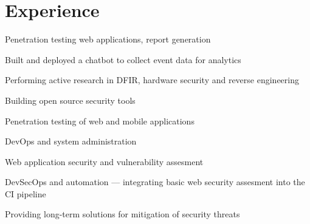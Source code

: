 \documentclass[]{resume-openfont}
\begin{document}
\hfill
\begin{minipage}[t]{0.66\textwidth} 


\section{Experience}
\vspace{\topsep} %
\begin{tightemize}
\item Penetration testing web applications, report generation
\item Built and deployed a chatbot to collect event data for analytics
\end{tightemize}
\sectionsep

\begin{tightemize}
\item Performing active research in DFIR, hardware security and reverse engineering
\item Building open source security tools	
\end{tightemize}
\sectionsep

\begin{tightemize}
\item Penetration testing of web and mobile applications
\item DevOps and system administration
\end{tightemize}
\sectionsep

\begin{tightemize}
\item Web application security and vulnerability assesment
\item DevSecOps and automation — integrating basic web security assesment into the CI pipeline
\item Providing long-term solutions for mitigation of security threats
\end{tightemize}
\sectionsep


\end{minipage}
\end{document}

